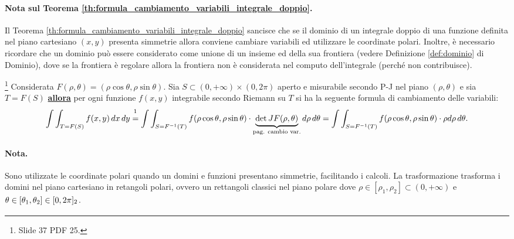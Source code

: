 \paragraph{Nota sul Teorema \ref{th:formula_cambiamento_variabili_integrale_doppio}.} Il Teorema \ref{th:formula_cambiamento_variabili_integrale_doppio} sancisce che se il dominio di un integrale doppio di una funzione definita nel piano cartesiano $(x,y)$ presenta simmetrie allora conviene cambiare variabili ed utilizzare le coordinate polari. Inoltre, è necessario ricordare che un dominio può essere considerato come unione di un insieme ed della sua frontiera (vedere Definizione \ref{def:dominio} di Dominio), dove se la frontiera è regolare allora la frontiera non è considerata nel computo dell'integrale (perché non contribuisce).

\begin{theorem}\label{th:formula_cambiamento_variabili_integrale_doppio}\footnote{Slide 37 PDF 25.}
	Considerata $F(\rho, \theta) = (\rho\cos\theta, \rho\sin\theta)$. Sia $S\subset(0, +\infty)\times(0,2\pi)$ aperto e misurabile secondo P-J nel piano $(\rho, \theta)$ e sia $T=F(S)$ \textbf{\ul{allora}} per ogni funzione $f(x,y)$ integrabile secondo Riemann su $T$ si ha la seguente formula di cambiamento delle variabili:
	\begin{equation}\label{eq:formula_cambiamento_variabili_integrale_doppio}
		\int\int_{T=F(S)} f(x,y)\, dx\, dy \overset{\footnotemark}{=} \int\int_{S = F^{-1}(T)} f(\rho\cos\theta, \rho\sin\theta) \cdot\underbrace{\det JF(\rho, \theta)}_{\text{pag. cambio var.}} d\rho\, d\theta = \int\int_{S = F^{-1}(T)} f(\rho\cos\theta, \rho\sin\theta) \cdot\rho d\rho\, d\theta.
	\end{equation}
\end{theorem}

\paragraph{Nota.} Sono utilizzate le coordinate polari quando un domini e funzioni presentano simmetrie, facilitando i calcoli. La trasformazione trasforma i domini nel piano cartesiano in retangoli polari, ovvero un rettangoli classici nel piano polare dove $\rho\in[\rho_1,\rho_2]\subset(0, +\infty)$ e $\theta\in[\theta_1, \theta_2]\in[0,2\pi]_{\footnotemark}$.

